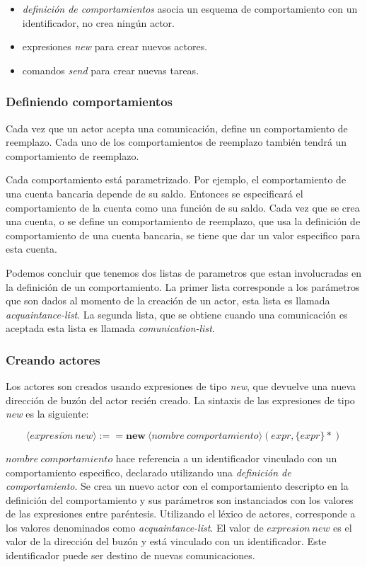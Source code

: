 \begin{itemize}
 \item \textit{definición de comportamientos} asocia un esquema de comportamiento con un identificador, no crea ningún actor.
 \item expresiones \textit{new} para crear nuevos actores.
 \item comandos \textit{send} para crear nuevas tareas.
\end{itemize}

\subsubsection*{Definiendo comportamientos}\label{actores:comportamientos}
Cada vez que un actor acepta una comunicación, define un comportamiento de reemplazo. Cada uno de los comportamientos de reemplazo también tendrá un comportamiento de reemplazo.

Cada comportamiento está parametrizado. Por ejemplo, el comportamiento de una cuenta bancaria depende de su saldo. Entonces se especificará el comportamiento de la cuenta como una función de su saldo. Cada vez que se crea una cuenta, o se define un comportamiento de reemplazo, que usa la definición de comportamiento de una cuenta bancaria, se tiene que dar un valor especifico para esta cuenta.

Podemos concluir que tenemos dos listas de parametros que estan involucradas en la definición de un comportamiento. La primer lista corresponde a los parámetros que son dados al momento de la creación de un actor, esta lista es llamada \textit{acquaintance-list}. La segunda lista, que se obtiene cuando una comunicación es aceptada esta lista es llamada \textit{comunication-list}.

\subsubsection*{Creando actores}
Los actores son creados usando expresiones de tipo \textit{new}, que devuelve una nueva dirección de buzón del actor recién creado. La sintaxis de las expresiones de tipo \textit{new} es la siguiente:

\[
   \langle expresi\acute{o}n\ new \rangle :== \textbf{new}\ \langle nombre\ comportamiento \rangle (expr, \{expr\}*)  
\]

$nombre\ comportamiento$ hace referencia a un identificador vinculado con un comportamiento especifico, declarado utilizando una \textit{definición de comportamiento}. Se crea un nuevo actor con el comportamiento descripto en la definición del comportamiento y sus parámetros son instanciados con los valores de las expresiones entre paréntesis. Utilizando el léxico de actores, corresponde a los valores denominados como \textit{acquaintance-list}. El valor de $expresion\ new$ es el valor de la dirección del buzón y está vinculado con un identificador. Este identificador puede ser destino de nuevas comunicaciones. 

